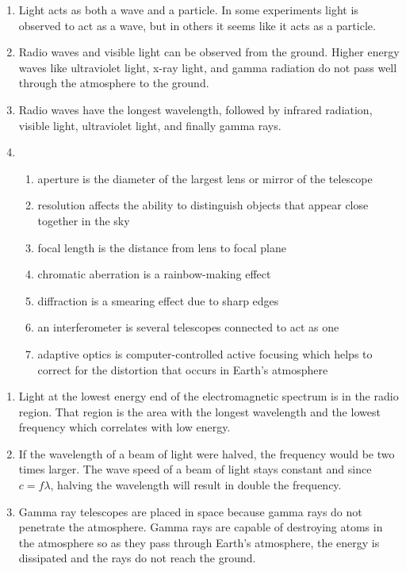 \documentclass[../hw1.tex]{subfiles}
\begin{document}
    \begin{enumerate}
        \item{} Light acts as both a wave and a particle. In some experiments light is observed to act as a wave, but in others it seems like it acts as a particle.
        \item{} Radio waves and visible light can be observed from the ground. Higher energy waves like ultraviolet light, x-ray light, and gamma radiation do not pass well through the atmosphere to the ground.
        \item{} Radio waves have the longest wavelength, followed by infrared radiation, visible light, ultraviolet light, and finally gamma rays.
        \item\begin{enumerate}
            \item aperture is  the diameter of the largest lens or mirror of the telescope
            \item resolution affects the  ability to distinguish objects that appear close together in the sky
            \item focal length is  the distance from lens to focal plane
            \item chromatic aberration is  a rainbow-making effect
            \item diffraction is  a smearing effect due to sharp edges
            \item an interferometer is  several telescopes connected to act as one
            \item adaptive optics is  computer-controlled active focusing which helps to correct for the distortion that occurs in Earth's atmosphere
        \end{enumerate}
    \end{enumerate}

    \begin{enumerate}
        \item{} Light at the lowest energy end of the electromagnetic spectrum is in the radio region. That region is the area with the longest wavelength and the lowest frequency which correlates with low energy.
        \item{} If the wavelength of a beam of light were halved, the frequency would be two times larger. The wave speed of a beam of light stays constant and since $c = f \lambda$, halving the wavelength will result in double the frequency.
        \item{} Gamma ray telescopes are placed in space because gamma rays do not penetrate the atmosphere. Gamma rays are capable of destroying atoms in the atmosphere so as they pass through Earth’s atmosphere, the energy is dissipated and the rays do not reach the ground.
    \end{enumerate}
    
\end{document}
